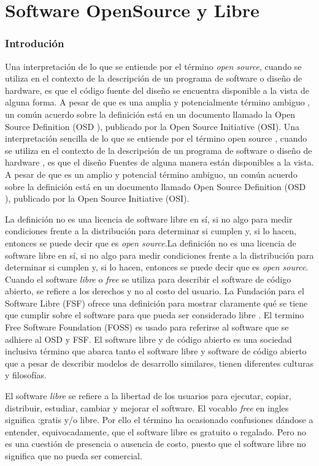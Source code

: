 \chapter{Software OpenSource y Libre}
		\subsection{Introdución} 
Una interpretación de lo que se entiende por el término \textit{open source}, cuando se utiliza en el contexto de la descripción de un programa de software o diseño de hardware, es que el código fuente del diseño se encuentra disponible a la vista de alguna forma. A pesar de que es una amplia y potencialmente término ambiguo , un común acuerdo sobre la definición está en un documento llamado la Open Source Definition (OSD ), publicado por la Open Source Initiative (OSI).
Una interpretación sencilla de lo que se entiende por el término open source , cuando se utiliza en el contexto de la descripción de un programa de software o diseño de hardware , es que el diseño Fuentes de alguna manera están disponibles a la vista. A pesar de que es un amplio y potencial término ambiguo, un común acuerdo sobre la definición está en un documento llamado  Open Source Definition (OSD ), publicado por la Open Source Initiative (OSI).

La definición no es una licencia de software libre en sí, si no algo para medir condiciones frente a la distribución para determinar si cumplen y, si lo hacen, entonces se puede decir que es \textit{open source}\cite{Etiqueta06}.La definición no es una licencia de software libre en sí, si no algo para medir condiciones frente a la distribución para determinar si cumplen y, si lo hacen, entonces se puede decir que es \textit{open source}. Cuando el software \textit{libre} o \textit{free} se utiliza para describir el software de código abierto, se refiere a los derechos y no al costo del usuario. La Fundación para el Software Libre (FSF) ofrece una definición para mostrar claramente qué se tiene que cumplir sobre el software para que pueda ser considerado libre \cite{Etiqueta07}. El termino Free Software Foundation (FOSS) es usado para referirse al software que se adhiere al OSD y FSF. El software libre y de código abierto es una sociedad inclusiva término que abarca tanto el software libre y software de código abierto que a pesar de describir modelos de desarrollo similares, tienen diferentes culturas y filosofías.

El software \textit{libre} se refiere a la libertad de los usuarios para ejecutar, copiar, distribuir, estudiar, cambiar y mejorar el software. El vocablo \textit{free} en ingles significa :gratis y/o libre. Por ello el término ha ocasionado confusiones dándose a entender, equivocadamente, que el software libre es gratuito o regalado. Pero no es una cuestión de presencia o ausencia de costo, puesto que el software libre no significa que no pueda ser comercial.

